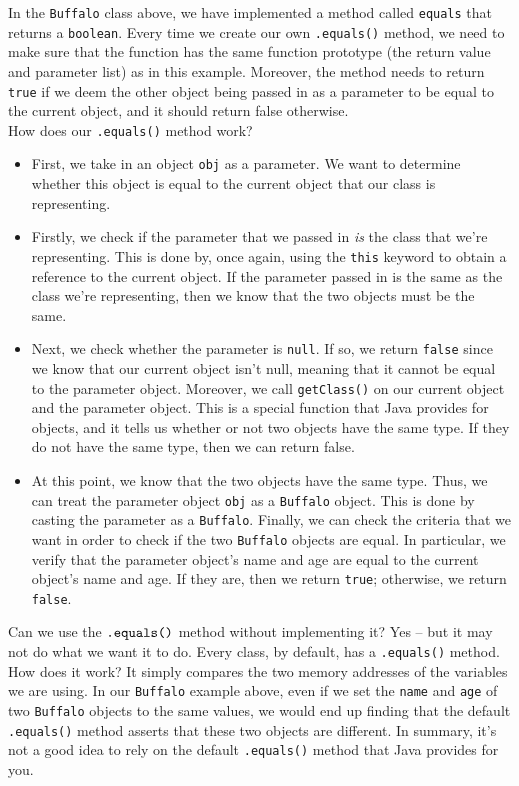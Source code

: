 In the \verb!Buffalo! class above, we have implemented a method called \verb!equals! that returns a \verb!boolean!. Every time we create our own \verb!.equals()! method, we need to make sure that the function has the same function prototype (the return value and parameter list) as in this example. Moreover, the method needs to return \verb!true! if we deem the other object being passed in as a parameter to be equal to the current object, and it should return false otherwise. \\

How does our \verb!.equals()! method work?

\begin{itemize}
    \item First, we take in an object \verb!obj! as a parameter. We want to determine whether this object is equal to the current object that our class is representing.
    \item Firstly, we check if the parameter that we passed in \textit{is} the class that we're representing. This is done by, once again, using the \verb!this! keyword to obtain a reference to the current object. If the parameter passed in is the same as the class we're representing, then we know that the two objects must be the same.
    \item Next, we check whether the parameter is \verb!null!. If so, we return \verb!false! since we know that our current object isn't null, meaning that it cannot be equal to the parameter object. Moreover, we call \verb!getClass()! on our current object and the parameter object. This is a special function that Java provides for objects, and it tells us whether or not two objects have the same type. If they do not have the same type, then we can return false.
    \item At this point, we know that the two objects have the same type. Thus, we can treat the parameter object \verb!obj! as a \verb!Buffalo! object. This is done by casting the parameter as a \verb!Buffalo!. Finally, we can check the criteria that we want in order to check if the two \verb!Buffalo! objects are equal. In particular, we verify that the parameter object's name and age are equal to the current object's name and age. If they are, then we return \verb!true!; otherwise, we return \verb!false!.
\end{itemize}


Can we use the $\verb!.equals()!$ method without implementing it? Yes -- but it may not do what we want it to do. Every class, by default, has a \verb!.equals()! method. How does it work? It simply compares the two memory addresses of the variables we are using. In our \verb!Buffalo! example above, even if we set the \verb!name! and \verb!age! of two \verb!Buffalo! objects to the same values, we would end up finding that the default \verb!.equals()! method asserts that these two objects are different. In summary, it's not a good idea to rely on the default \verb!.equals()! method that Java provides for you.


